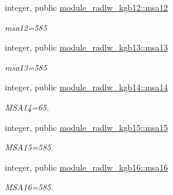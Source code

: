 \begin{DoxyCompactItemize}
\mbox{\label{namespacemodule__radlw__kgb12_ad1ddd94fe11b11485502d1fe6f5a1615}} 
integer, public \hyperlink{namespacemodule__radlw__kgb12_ad1ddd94fe11b11485502d1fe6f5a1615}{module\+\_\+radlw\+\_\+kgb12\+::msa12}
\begin{DoxyCompactList}\small\item\em msa12=585 \end{DoxyCompactList}\item 
\mbox{\label{namespacemodule__radlw__kgb13_a07932a22e5f8de248765a207e170ce6f}} 
integer, public \hyperlink{namespacemodule__radlw__kgb13_a07932a22e5f8de248765a207e170ce6f}{module\+\_\+radlw\+\_\+kgb13\+::msa13}
\begin{DoxyCompactList}\small\item\em msa13=585 \end{DoxyCompactList}\item 
\mbox{\label{namespacemodule__radlw__kgb14_a9357fbaa5663438f0c0062a45c99a8d4}} 
integer, public \hyperlink{namespacemodule__radlw__kgb14_a9357fbaa5663438f0c0062a45c99a8d4}{module\+\_\+radlw\+\_\+kgb14\+::msa14}
\begin{DoxyCompactList}\small\item\em M\+S\+A14=65. \end{DoxyCompactList}\item 
\mbox{\label{namespacemodule__radlw__kgb15_abb9e98034166a07a6e349631d7fbb2a3}} 
integer, public \hyperlink{namespacemodule__radlw__kgb15_abb9e98034166a07a6e349631d7fbb2a3}{module\+\_\+radlw\+\_\+kgb15\+::msa15}
\begin{DoxyCompactList}\small\item\em M\+S\+A15=585. \end{DoxyCompactList}\item 
\mbox{\label{namespacemodule__radlw__kgb16_a95bf5395b579ca6619de3fc40c7ded79}} 
integer, public \hyperlink{namespacemodule__radlw__kgb16_a95bf5395b579ca6619de3fc40c7ded79}{module\+\_\+radlw\+\_\+kgb16\+::msa16}
\begin{DoxyCompactList}\small\item\em M\+S\+A16=585. \end{DoxyCompactList}\end{DoxyCompactItemize}
